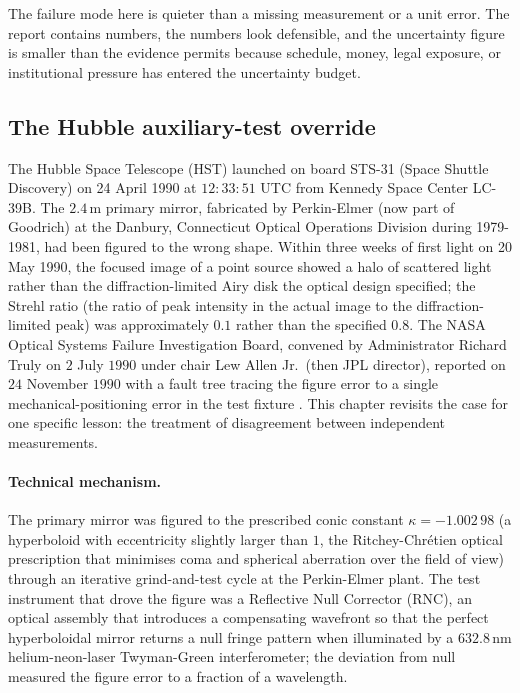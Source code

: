 The failure mode here is quieter than a missing measurement or a
unit error. The report contains numbers, the numbers look defensible,
and the uncertainty figure is smaller than the evidence permits
because schedule, money, legal exposure, or institutional pressure
has entered the uncertainty budget.

\subsection{The Hubble auxiliary-test override}

The Hubble Space Telescope (HST) launched on board STS-31
(Space Shuttle Discovery) on 24 April 1990 at $12{:}33{:}51$ UTC
from Kennedy Space Center LC-39B. The $2.4\,\si{\meter}$
primary mirror, fabricated by Perkin-Elmer (now part of Goodrich)
at the Danbury, Connecticut Optical Operations Division during
1979-1981, had been figured to the wrong shape. Within three
weeks of first light on 20 May 1990, the focused image of a
point source showed a halo of scattered light rather than the
diffraction-limited Airy disk the optical design specified; the
Strehl ratio (the ratio of peak intensity in the actual image to
the diffraction-limited peak) was approximately $0.1$ rather than
the specified $0.8$. The NASA Optical Systems Failure
Investigation Board, convened by Administrator Richard Truly on
$2$ July $1990$ under chair Lew Allen Jr.\ (then JPL director),
reported on $24$ November $1990$ with a fault tree tracing the
figure error to a single mechanical-positioning error in the
test fixture \cite{acc:nasa-hubble-optical-systems-1990}. This
chapter revisits the case for one specific lesson: the treatment
of disagreement between independent measurements.

\paragraph{Technical mechanism.}
The primary mirror was figured to the prescribed conic constant
$\kappa = -1.002\,98$ (a hyperboloid with eccentricity
slightly larger than $1$, the Ritchey-Chr\'etien optical
prescription that minimises coma and spherical aberration over
the field of view) through an iterative grind-and-test cycle at
the Perkin-Elmer plant. The test instrument that drove the
figure was a Reflective Null Corrector (RNC), an optical assembly
that introduces a compensating wavefront so that the perfect
hyperboloidal mirror returns a null fringe pattern when
illuminated by a $632.8\,\si{\nano\meter}$ helium-neon-laser
Twyman-Green interferometer; the deviation from null measured the
figure error to a fraction of a wavelength.

